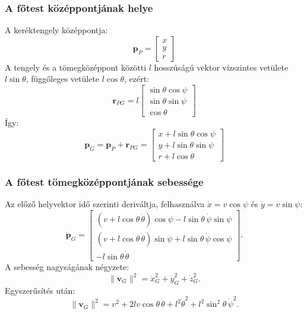 \documentclass[12pt,a4paper]{report}
\begin{document}
	\subsubsection{A főtest középpontjának helye}
	
	A keréktengely középpontja:
	\begin{equation}
	\mathbf p_P=
	\begin{bmatrix}
		x\\y\\r
	\end{bmatrix}
	\end{equation}
	A tengely és a tömegközéppont közötti \(l\) hosszúságú vektor vízszintes vetülete \(l\sin\theta\), függőleges vetülete \(l\cos\theta\), ezért:
	\begin{equation}
	\mathbf r_{PG}
	=
	l
	\begin{bmatrix}
		\sin\theta\cos\psi\\
		\sin\theta\sin\psi\\
		\cos\theta
	\end{bmatrix}
	\end{equation}
	Így:
	\begin{equation}
	\boxed{
		\mathbf p_G
		=
		\mathbf p_P+\mathbf r_{PG}
		=
		\begin{bmatrix}
			x+l\sin\theta\cos\psi\\
			y+l\sin\theta\sin\psi\\
			r+l\cos\theta
		\end{bmatrix}
	}
	\end{equation}
	
	\subsubsection{A főtest tömegközéppontjának sebessége
		}
		
	Az előző helyvektor idő szerinti deriváltja, felhasználva \(\dot x=v\cos\psi\) és \(\dot y=v\sin\psi\):
	\begin{equation}
	\dot{\mathbf p}_G=
	\begin{bmatrix}
		(v+l\cos\theta\,\dot\theta)\cos\psi-l\sin\theta\,\dot\psi\sin\psi\\
		(v+l\cos\theta\,\dot\theta)\sin\psi+l\sin\theta\,\dot\psi\cos\psi\\
		-l\sin\theta\,\dot\theta
	\end{bmatrix}.
	\end{equation}
	A sebesség nagyságának négyzete:
	\begin{equation}
	\|\mathbf v_G\|^2
	=
	\dot x_G^2+\dot y_G^2+\dot z_G^2.
	\end{equation}
	Egyszerűsítés után:
	\begin{equation}
	\boxed{
		\|\mathbf v_G\|^2
		=
		v^2+2lv\cos\theta\,\dot\theta
		+l^2\dot\theta^2
		+l^2\sin^2\theta\,\dot\psi^2.
	}
	\end{equation}
	
\end{document}
